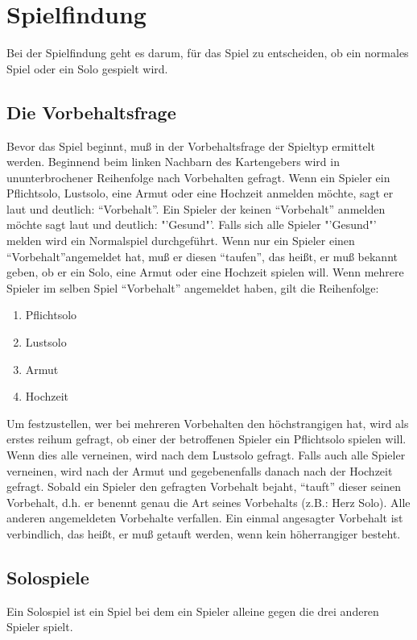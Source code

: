 \documentclass{scrartcl}
\begin{document}
\section{Spielfindung}
Bei der Spielfindung geht es darum, für das Spiel zu entscheiden, ob ein normales Spiel oder ein Solo gespielt wird.

\subsection{Die Vorbehaltsfrage}
Bevor das Spiel beginnt, muß in der Vorbehaltsfrage der Spieltyp ermittelt werden. Beginnend beim linken Nachbarn des Kartengebers wird in ununterbrochener Reihenfolge nach Vorbehalten gefragt.  Wenn ein Spieler ein Pflichtsolo, Lustsolo, eine Armut oder eine Hochzeit anmelden möchte, sagt er laut und deutlich: "`Vorbehalt"'. Ein Spieler der keinen "`Vorbehalt"' anmelden möchte sagt laut und deutlich: "'Gesund"'. Falls sich alle Spieler "'Gesund"' melden wird ein Normalspiel durchgeführt.  Wenn nur ein Spieler einen "`Vorbehalt"'angemeldet hat, muß er diesen "`taufen"', das heißt, er muß bekannt geben, ob er ein Solo, eine Armut oder eine Hochzeit spielen will. Wenn mehrere Spieler im selben Spiel "`Vorbehalt"' angemeldet haben, gilt die Reihenfolge:

\begin{enumerate}
  \item Pflichtsolo
  \item Lustsolo
  \item Armut
  \item Hochzeit
\end{enumerate}

Um festzustellen, wer bei mehreren Vorbehalten den höchstrangigen hat, wird als erstes reihum gefragt, ob einer der betroffenen Spieler ein Pflichtsolo spielen will. Wenn dies alle verneinen, wird nach dem Lustsolo gefragt. Falls auch alle Spieler verneinen, wird nach der Armut und gegebenenfalls danach nach der Hochzeit gefragt. Sobald ein Spieler den gefragten Vorbehalt bejaht, "`tauft"' dieser seinen Vorbehalt, d.h. er benennt genau die Art seines Vorbehalts (z.B.: Herz Solo). Alle anderen angemeldeten Vorbehalte verfallen. Ein einmal angesagter Vorbehalt ist verbindlich, das heißt, er muß getauft werden, wenn kein höherrangiger besteht.

\subsection{\label{solo}Solospiele}
Ein Solospiel ist ein Spiel bei dem ein Spieler alleine gegen die drei anderen Spieler spielt.
\end{document}
